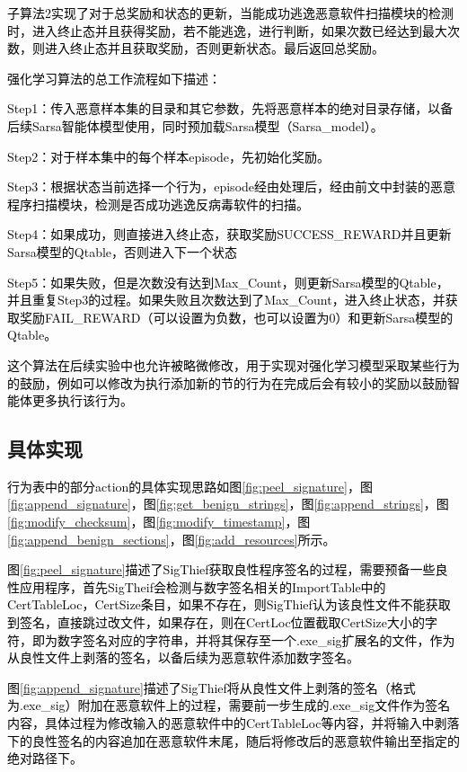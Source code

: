 \textcolor{black}{子算法2实现了对于总奖励和状态的更新，当能成功逃逸恶意软件扫描模块的检测时，进入终止态并且获得奖励，若不能逃逸，进行判断，如果次数已经达到最大次数，则进入终止态并且获取奖励，否则更新状态。最后返回总奖励。}

\textcolor{black}{强化学习算法的总工作流程如下描述：}

\textcolor{black}{Step1：传入恶意样本集的目录和其它参数，先将恶意样本的绝对目录存储，以备后续Sarsa智能体模型使用，同时预加载Sarsa模型（Sarsa\_model）。}

\textcolor{black}{Step2：对于样本集中的每个样本episode，先初始化奖励。}

\textcolor{black}{Step3：根据状态当前选择一个行为，episode经由处理后，经由前文中封装的恶意程序扫描模块，检测是否成功逃逸反病毒软件的扫描。}

\textcolor{black}{Step4：如果成功，则直接进入终止态，获取奖励SUCCESS\_REWARD并且更新Sarsa模型的Qtable，否则进入下一个状态}

\textcolor{black}{Step5：如果失败，但是次数没有达到Max\_Count，则更新Sarsa模型的Qtable，并且重复Step3的过程。如果失败且次数达到了Max\_Count，进入终止状态，并获取奖励FAIL\_REWARD（可以设置为负数，也可以设置为0）和更新Sarsa模型的Qtable。}

\textcolor{black}{这个算法在后续实验中也允许被略微修改，用于实现对强化学习模型采取某些行为的鼓励，例如可以修改为执行添加新的节的行为在完成后会有较小的奖励以鼓励智能体更多执行该行为。}

\subsection{具体实现}

\textcolor{black}{行为表中的部分action的具体实现思路如图\ref{fig:peel_signature}，图\ref{fig:append_signature}，图\ref{fig:get_benign_strings}，图\ref{fig:append_strings}，图\ref{fig:modify_checksum}，图\ref{fig:modify_timestamp}，图\ref{fig:append_benign_sections}，图\ref{fig:add_resources}所示。}

\textcolor{black}{图\ref{fig:peel_signature}描述了SigThief获取良性程序签名的过程，需要预备一些良性应用程序，首先SigTheif会检测与数字签名相关的ImportTable中的CertTableLoc，CertSize条目，如果不存在，则SigThief认为该良性文件不能获取到签名，直接跳过改文件，如果存在，则在CertLoc位置截取CertSize大小的字符，即为数字签名对应的字符串，并将其保存至一个.exe\_sig扩展名的文件，作为从良性文件上剥落的签名，以备后续为恶意软件添加数字签名。}

\textcolor{black}{图\ref{fig:append_signature}描述了SigThief将从良性文件上剥落的签名（格式为.exe\_sig）附加在恶意软件上的过程，需要前一步生成的.exe\_sig文件作为签名内容，具体过程为修改输入的恶意软件中的CertTableLoc等内容，并将输入中剥落下的良性签名的内容追加在恶意软件末尾，随后将修改后的恶意软件输出至指定的绝对路径下。}

